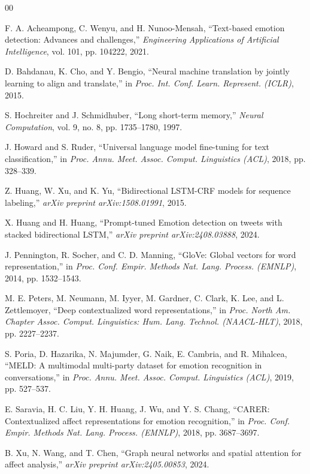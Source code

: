 \documentclass[conference]{IEEEtran}
\begin{document}
\begin{thebibliography}{00}

 F. A. Acheampong, C. Wenyu, and H. Nunoo-Mensah, ``Text-based emotion detection: Advances and challenges,'' \textit{Engineering Applications of Artificial Intelligence}, vol. 101, pp. 104222, 2021.

 D. Bahdanau, K. Cho, and Y. Bengio, ``Neural machine translation by jointly learning to align and translate,'' in \textit{Proc. Int. Conf. Learn. Represent. (ICLR)}, 2015.

 S. Hochreiter and J. Schmidhuber, ``Long short-term memory,'' \textit{Neural Computation}, vol. 9, no. 8, pp. 1735--1780, 1997.

 J. Howard and S. Ruder, ``Universal language model fine-tuning for text classification,'' in \textit{Proc. Annu. Meet. Assoc. Comput. Linguistics (ACL)}, 2018, pp. 328--339.

 Z. Huang, W. Xu, and K. Yu, ``Bidirectional LSTM-CRF models for sequence labeling,'' \textit{arXiv preprint arXiv:1508.01991}, 2015.

 X. Huang and H. Huang, ``Prompt-tuned Emotion detection on tweets with stacked bidirectional LSTM,'' \textit{arXiv preprint arXiv:2408.03888}, 2024.

 J. Pennington, R. Socher, and C. D. Manning, ``GloVe: Global vectors for word representation,'' in \textit{Proc. Conf. Empir. Methods Nat. Lang. Process. (EMNLP)}, 2014, pp. 1532--1543.

 M. E. Peters, M. Neumann, M. Iyyer, M. Gardner, C. Clark, K. Lee, and L. Zettlemoyer, ``Deep contextualized word representations,'' in \textit{Proc. North Am. Chapter Assoc. Comput. Linguistics: Hum. Lang. Technol. (NAACL-HLT)}, 2018, pp. 2227--2237.

 S. Poria, D. Hazarika, N. Majumder, G. Naik, E. Cambria, and R. Mihalcea, ``MELD: A multimodal multi-party dataset for emotion recognition in conversations,'' in \textit{Proc. Annu. Meet. Assoc. Comput. Linguistics (ACL)}, 2019, pp. 527--537.

 E. Saravia, H. C. Liu, Y. H. Huang, J. Wu, and Y. S. Chang, ``CARER: Contextualized affect representations for emotion recognition,'' in \textit{Proc. Conf. Empir. Methods Nat. Lang. Process. (EMNLP)}, 2018, pp. 3687--3697.

 B. Xu, N. Wang, and T. Chen, ``Graph neural networks and spatial attention for affect analysis,'' \textit{arXiv preprint arXiv:2405.00853}, 2024.


\end{thebibliography}
\end{document}
